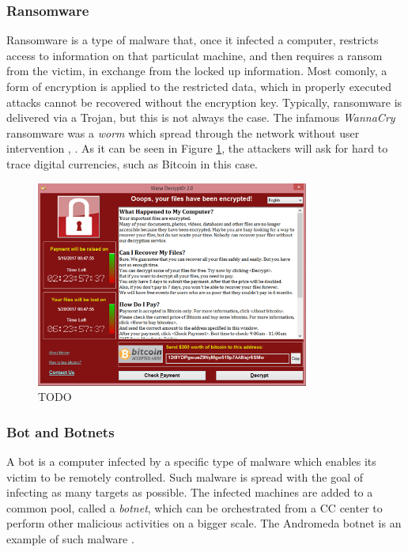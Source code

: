 \subsubsection{Ransomware}

Ransomware is a type of malware that, once it infected a computer, restricts access to information on that particulat machine, and then requires a ransom from the victim, in exchange from the locked up information. Most comonly, a form of encryption is applied to the restricted data, which in properly executed attacks cannot be recovered without the encryption key. Typically, ransomware is delivered via a Trojan, but this is not always the case. The infamous \emph{WannaCry} ransomware was a \emph{worm} which spread through the network without user intervention \cite{wiki_wannacry}, \cite{wiki_ransomware}. As it can be seen in Figure \ref{fig:wannacry}, the attackers will ask for hard to trace digital currencies, such as Bitcoin in this case.

\begin{figure}[h]
    \centering
    \includegraphics[width=0.8\textwidth]{./images/wanacry.png}
    \caption{TODO}
    \label{fig:wannacry}
\end{figure}

\subsubsection{Bot and Botnets}

A bot is a computer infected by a specific type of malware which enables its victim to be remotely controlled. Such malware is spread with the goal of infecting as many targets as possible. The infected machines are added to a common pool, called a \emph{botnet}, which can be orchestrated from a \gls{CC} center to perform other malicious activities on a bigger scale. The Andromeda botnet is an example of such malware \cite{andromeda} \cite{kaspersky_malware_types}.

